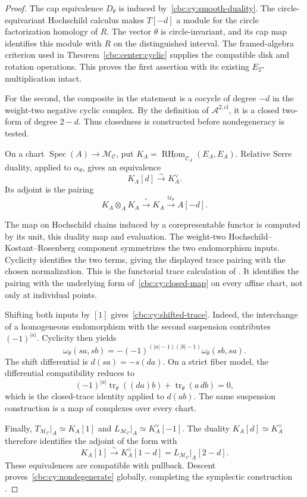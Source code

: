 \begin{proof}
The cap equivalence $D_\theta$ is induced by~\eqref{cbc:cy:smooth-duality}.
The circle-equivariant Hochschild calculus makes $T[-d]$ a module for the circle factorization homology of $R$.
The vector $\theta$ is circle-invariant, and its cap map identifies this module with $R$ on the distinguished interval.
The framed-algebra criterion used in Theorem~\ref{cbc:center:cyclic} supplies the compatible disk and rotation operations.
This proves the first assertion with its existing $E_2$-multiplication intact.

For the second, the composite in the statement is a cocycle of degree $-d$ in the weight-two negative cyclic complex.
By the definition of $\mathcal A^{2,\mathrm{cl}}$, it is a closed two-form of degree $2-d$.
Thus closedness is constructed before nondegeneracy is tested.

On a chart $\operatorname{Spec}(A)\to\mathcal M_{\mathcal C}$, put
$K_A=\underline{\operatorname{RHom}}_{\mathcal C_A}(E_A,E_A)$.
Relative Serre duality, applied to $\alpha_\theta$, gives an equivalence
\[
 K_A[d]\xrightarrow{\sim}K_A^\vee.
\]
Its adjoint is the pairing
\[
 K_A\otimes_A K_A\xrightarrow{\ \circ\ }K_A
             \xrightarrow{\operatorname{tr}_\theta}A[-d].
\]

The map on Hochschild chains induced by a corepresentable functor is computed by its unit, this duality map and evaluation.
The weight-two Hochschild--Kostant--Rosenberg component symmetrizes the two endomorphism inputs.
Cyclicity identifies the two terms, giving the displayed trace pairing with the chosen normalization.
This is the functorial trace calculation of
\cite[Corollary~2.5 and Propositions~4.5 and 5.3]{BravDyckerhoff}.
It identifies the pairing with the underlying form of~\eqref{cbc:cy:closed-map} on every affine chart, not only at individual points.

Shifting both inputs by $[1]$ gives~\eqref{cbc:cy:shifted-trace}.
Indeed, the interchange of a homogeneous endomorphism with the second suspension contributes $(-1)^{|a|}$.
Cyclicity then yields
\[
 \omega_\theta(sa,sb)
 =-(-1)^{(|a|-1)(|b|-1)}\omega_\theta(sb,sa).
\]
The shift differential is $d(sa)=-s(da)$.
On a strict fiber model, the differential compatibility reduces to
\[
 (-1)^{|a|}\operatorname{tr}_\theta((da)b)
       +\operatorname{tr}_\theta(a\,db)=0,
\]
which is the closed-trace identity applied to $d(ab)$.
The same suspension construction is a map of complexes over every chart.

Finally, $T_{\mathcal M_{\mathcal C}}|_A\simeq K_A[1]$ and
$L_{\mathcal M_{\mathcal C}}|_A\simeq K_A^\vee[-1]$.
The duality $K_A[d]\simeq K_A^\vee$ therefore identifies the adjoint of the form with
\[
 K_A[1]\xrightarrow{\sim}K_A^\vee[1-d]
      =L_{\mathcal M_{\mathcal C}}|_A[2-d].
\]
These equivalences are compatible with pullback.
Descent proves~\eqref{cbc:cy:nondegenerate} globally, completing the symplectic construction
\cite[Theorem~5.5(1)]{BravDyckerhoff}.
\end{proof}

